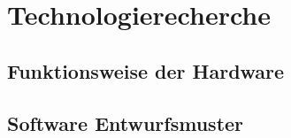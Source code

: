 \section{Technologierecherche}
\subsection{Funktionsweise der Hardware}
\subsection{Software Entwurfsmuster}